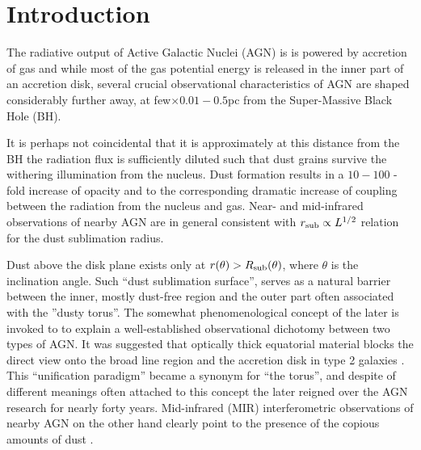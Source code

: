 \documentclass[12pt,english,preprint]{aastex}
\newcommand{\su}[2]{#1_{\rm #2}}
\newcommand{\rsub}{ \su{R}{sub} }
\begin{document}



\section{Introduction}

The radiative output of Active Galactic Nuclei (AGN) is is powered
by accretion of gas and while most of the gas potential energy is
released in the inner part of an accretion disk, several crucial observational
characteristics of AGN are shaped considerably further away, at few$\times0.01-0.5$pc
from the Super-Massive Black Hole (BH).

It is perhaps not coincidental that it is approximately at this
distance from the BH the radiation flux is sufficiently diluted such
that dust grains survive the withering illumination from the nucleus.
Dust formation results in a $10-100$ -fold increase of opacity and to
the corresponding dramatic increase of coupling between the radiation
from the nucleus and gas. Near- and mid-infrared observations
of nearby AGN are in general consistent with
$r_{{\rm sub}}\propto L^{1/2}$ relation for the dust sublimation
radius.

Dust above the disk plane exists only at $r(\theta)>\rsub(\theta)$,
where $\theta$ is the inclination angle. Such ``dust sublimation
surface'', serves as a natural barrier between the inner, mostly
dust-free region and the outer part often associated with the ''dusty
torus''.  The somewhat phenomenological concept of the later is
invoked to to explain a well-established observational dichotomy
between two types of AGN.  It was suggested that optically thick
equatorial material blocks the direct view onto the broad line region
and the accretion disk in type 2 galaxies
\citep{Rowan-Robinson77,Antonucci84,AntonucciMiller1985,UrryPadovani95}.
This ``unification paradigm'' became a synonym for ``the torus'', and
despite of different meanings often attached to this concept the later
reigned over the AGN research for nearly forty years. Mid-infrared
(MIR) interferometric observations of nearby AGN on the other hand
clearly point to the presence of the copious amounts of dust
\citep{Jaffe2004,Raban09,Tristram14,Tristram2011}.
\end{document}
